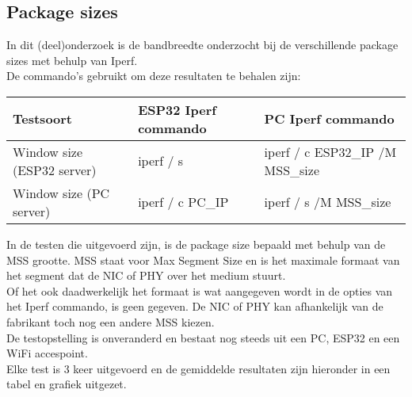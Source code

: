 \documentclass[../DCM2_Verslag.tex]{subfiles}
\begin{document}
\subsection{Package sizes}
In dit (deel)onderzoek is de bandbreedte onderzocht bij de verschillende package sizes met behulp van Iperf. \\
De commando's gebruikt om deze resultaten te behalen zijn:\\
\begin{center}
\begin{tabular}{||l|l|l|}
   	 Testsoort & ESP32 Iperf commando & PC Iperf commando\\
   	 \hline \hline    
   	 Window size (ESP32 server) & iperf \-/ s & iperf \-/ c ESP32\_IP \-/M MSS\_size\\
   	 Window size (PC server) & iperf \-/ c PC\_IP & iperf \-/ s \-/M MSS\_size \\
   	 \hline
	\end{tabular}
\end{center}
In de testen die uitgevoerd zijn, is de package size bepaald met behulp van de MSS grootte. MSS staat voor Max Segment Size en is het maximale formaat van het segment dat de NIC of PHY over het medium stuurt. \\
Of het ook daadwerkelijk het formaat is wat aangegeven wordt in de opties van het Iperf commando, is geen gegeven. De NIC of PHY kan afhankelijk van de fabrikant toch nog een andere MSS kiezen.\\
De testopstelling is onveranderd en bestaat nog steeds uit een PC, ESP32 en een WiFi accespoint.\\
Elke test is 3 keer uitgevoerd en de gemiddelde resultaten zijn hieronder in een tabel en grafiek uitgezet.\\
\end{document}
